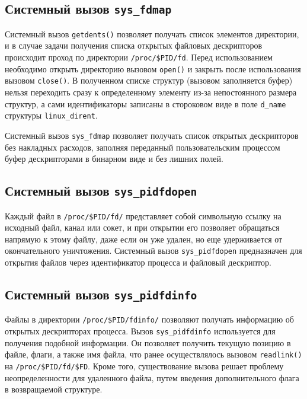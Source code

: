 \subsection{Системный вызов \texttt{sys\_fdmap}}
\label{sub:sys:sys_fdmap}

Системный вызов \texttt{getdents()} позволяет получать список элементов
директории, и в случае задачи получения списка открытых файловых
дескрипторов происходит проход по директории \texttt{/proc/\$PID/fd}. Перед
использованием необходимо открыть директорию вызовом \texttt{open()} и закрыть
после использования вызовом \texttt{close()}. В полученном списке структур
(вызовом заполняется буфер) нельзя переходить сразу к определенному элементу
из-за непостоянного размера структур, а сами идентификаторы записаны в
стороковом виде в поле \texttt{d\_name} структуры \texttt{linux\_dirent}.

Системный вызов \texttt{sys\_fdmap} позволяет получать список открытых
дескрипторов без накладных расходов, заполняя переданный пользовательским
процессом буфер дескрипторами в бинарном виде и без лишних полей.

\subsection{Системный вызов \texttt{sys\_pidfdopen}}
\label{sub:sys:sys_pidfdopen}

Каждый файл в \texttt{/proc/\$PID/fd/} представляет собой символьную ссылку на
исходный файл, канал или сокет, и при открытии его позволяет обращаться напрямую
к этому файлу, даже если он уже удален, но еще удерживается от окончательного
уничтожения. Системный вызов \texttt{sys\_pidfdopen} предназначен для открытия
файлов через идентификатор процесса и файловый дескриптор. 

\subsection{Системный вызов \texttt{sys\_pidfdinfo}}
\label{sub:sys:sys_pidfdinfo}

Файлы в директории \texttt{/proc/\$PID/fdinfo/} позволяют получать информацию
об открытых дескрипторах процесса. Вызов
\texttt{sys\_pidfdinfo} используется для получения подобной информации. Он
позволяет получить текущую позицию в файле, флаги, а также имя файла, что ранее
осуществлялось вызовом \texttt{readlink()} на \texttt{/proc/\$PID/fd/\$FD}.
Кроме того, существование вызова решает проблему неопределенности для удаленного
файла, путем введения дополнительного флага в возвращаемой структуре.

